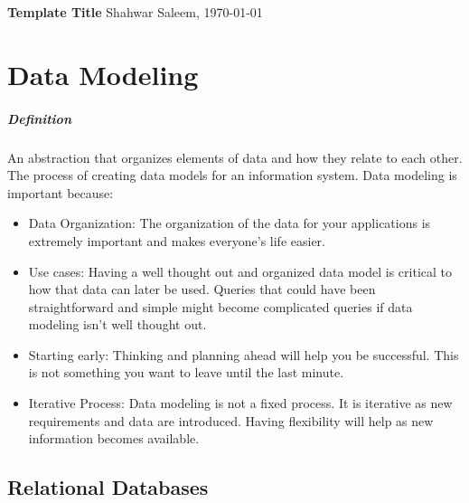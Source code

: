 \documentclass[
	paper=a4,%
	pagesize,%
	8pt, fleqn,%
	headings=small,%
	notitlepage,%
	parskip=never]%
	{scrreprt}
\newcommand{\mytitle}{Template Title}
\newcommand{\myauthor}{Shahwar Saleem}
\begin{document}
\begin{multicols*}{3}

{\bfseries\sffamily\LARGE\mytitle} \vspace{0.35em}  \hfill \myauthor, \today \vspace{0.5em}



\hfill

\chapter{Data Modeling}
\paragraph{Definition} An abstraction that organizes elements of data and how they relate to each other. The process of creating data models for an information system. Data modeling is important because:
\begin{itemize}
\item Data Organization: The organization of the data for your applications is extremely important and makes everyone's life easier.

\item Use cases: Having a well thought out and organized data model is critical to how that data can later be used. Queries that could have been straightforward and simple might become complicated queries if data modeling isn't well thought out.

\item Starting early: Thinking and planning ahead will help you be successful. This is not something you want to leave until the last minute.

\item Iterative Process: Data modeling is not a fixed process. It is iterative as new requirements and data are introduced. Having flexibility will help as new information becomes available.



\end{itemize}

\section{Relational Databases}
\begin{itemize}


\end{itemize}
\end{multicols*}
\end{document}
